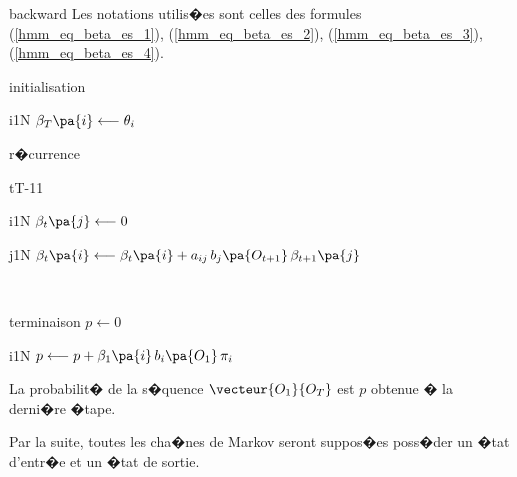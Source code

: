         \begin{xalgorithm}{backward} \label{hmm_algo_backward_es}
        Les notations utilis�es sont celles des formules (\ref{hmm_eq_beta_es_1}), (\ref{hmm_eq_beta_es_2}), (\ref{hmm_eq_beta_es_3}),
        (\ref{hmm_eq_beta_es_4}).
        
        \begin{xalgostep}{initialisation}
                \begin{xfor}{i}{1}{N}
                $\beta_T\pa{i} \longleftarrow \theta_i$
                \end{xfor}
        \end{xalgostep}
        
        \begin{xalgostep}{r�currence}
                \begin{xfor}{t}{T-1}{1}
                        \begin{xfor}{i}{1}{N}
                                $\beta_{t}\pa{j} \longleftarrow 0$ \\
                                \begin{xfor}{j}{1}{N}
                                        $\beta_{t}\pa{i} \longleftarrow \beta_{t}\pa{i} + a_{ij} \, b_{j}\pa{O_{t+1}} \, \beta_{t+1} \pa{j}$
                                \end{xfor} \\
                        \end{xfor}
                \end{xfor}
        \end{xalgostep}
        
        \begin{xalgostep}{terminaison}
                $p \longleftarrow 0$ \\
                \begin{xfor}{i}{1}{N}
                        $p \longleftarrow p + \beta_{1}\pa{i} \, b_i\pa{O_1} \, \pi_i $
                \end{xfor}
        \end{xalgostep}
        
        La probabilit� de la s�quence $\vecteur{O_1}{O_T}$ est $p$ obtenue � la derni�re �tape.
        
        \end{xalgorithm}
        

        
Par la suite, toutes les cha�nes de Markov seront suppos�es poss�der un �tat d'entr�e et un �tat de sortie.











